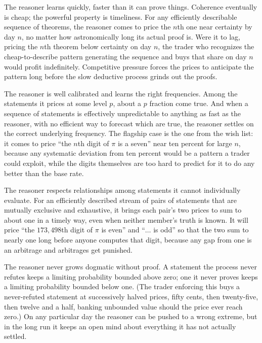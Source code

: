 \documentclass[10pt]{article}
\theoremstyle{definition}
\theoremstyle{remark}
\begin{document}
The reasoner learns quickly, faster than it can prove things. Coherence eventually is cheap; the powerful property is timeliness. For any efficiently describable sequence of theorems, the reasoner comes to price the $n$th one near certainty by day $n$, no matter how astronomically long its actual proof is. Were it to lag, pricing the $n$th theorem below certainty on day $n$, the trader who recognizes the cheap-to-describe pattern generating the sequence and buys that share on day $n$ would profit indefinitely. Competitive pressure forces the prices to anticipate the pattern long before the slow deductive process grinds out the proofs.

The reasoner is well calibrated and learns the right frequencies. Among the statements it prices at some level $p$, about a $p$ fraction come true. And when a sequence of statements is effectively unpredictable to anything as fast as the reasoner, with no efficient way to forecast which are true, the reasoner settles on the correct underlying frequency. The flagship case is the one from the wish list: it comes to price ``the $n$th digit of $\pi$ is a seven'' near ten percent for large $n$, because any systematic deviation from ten percent would be a pattern a trader could exploit, while the digits themselves are too hard to predict for it to do any better than the base rate.

The reasoner respects relationships among statements it cannot individually evaluate. For an efficiently described stream of pairs of statements that are mutually exclusive and exhaustive, it brings each pair's two prices to sum to about one in a timely way, even when neither member's truth is known. It will price ``the $173{,}498$th digit of $\pi$ is even'' and ``$\dots$ is odd'' so that the two sum to nearly one long before anyone computes that digit, because any gap from one is an arbitrage and arbitrages get punished.

The reasoner never grows dogmatic without proof. A statement the process never refutes keeps a limiting probability bounded above zero; one it never proves keeps a limiting probability bounded below one. (The trader enforcing this buys a never-refuted statement at successively halved prices, fifty cents, then twenty-five, then twelve and a half, banking unbounded value should the price ever reach zero.) On any particular day the reasoner can be pushed to a wrong extreme, but in the long run it keeps an open mind about everything it has not actually settled.
\end{document}
